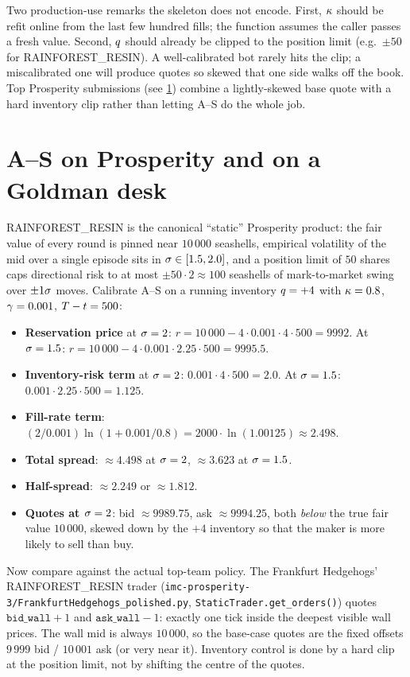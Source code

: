 Two production-use remarks the skeleton does not encode. First,
$\kappa$ should be refit online from the last few hundred
fills; the function assumes the caller passes a fresh value. Second,
$q$ should already be clipped to the position limit (e.g.\
$\pm 50$ for RAINFOREST\_RESIN). A well-calibrated bot rarely hits
the clip; a miscalibrated one will produce quotes so skewed that
one side walks off the book. Top Prosperity submissions (see
\cref{sec:ch8_onprosperity}) combine a lightly-skewed base quote
with a hard inventory clip rather than letting A--S do the whole
job.

\section{A--S on Prosperity and on a Goldman desk}
\label{sec:ch8_onprosperity}

\begin{prosperitybox}[title={Prosperity example: RAINFOREST\_RESIN}]
RAINFOREST\_RESIN is the canonical ``static'' Prosperity
product: the fair value of every round is pinned near
$10\,000$ seashells, empirical volatility of the mid over a
single episode sits in $\sigma \in [1.5, 2.0]$, and a position
limit of $50$ shares caps directional risk to at most
$\pm 50 \cdot 2 \approx 100$ seashells of mark-to-market swing
over $\pm 1\sigma$ moves. Calibrate A--S on a running inventory
$q = +4$ with $\kappa = 0.8$, $\gamma = 0.001$,
$T - t = 500$:
\begin{itemize}
  \item \textbf{Reservation price} at $\sigma = 2$:
  $r = 10\,000 - 4 \cdot 0.001 \cdot 4 \cdot 500 = 9992$.
  At $\sigma = 1.5$: $r = 10\,000 - 4 \cdot 0.001 \cdot 2.25
  \cdot 500 = 9995.5$.
  \item \textbf{Inventory-risk term} at $\sigma = 2$:
  $0.001 \cdot 4 \cdot 500 = 2.0$. At $\sigma = 1.5$:
  $0.001 \cdot 2.25 \cdot 500 = 1.125$.
  \item \textbf{Fill-rate term}: $(2/0.001)\ln(1 + 0.001/0.8)
  = 2000 \cdot \ln(1.00125) \approx 2.498$.
  \item \textbf{Total spread}: $\approx 4.498$ at $\sigma = 2$,
  $\approx 3.623$ at $\sigma = 1.5$.
  \item \textbf{Half-spread}: $\approx 2.249$ or $\approx 1.812$.
  \item \textbf{Quotes at $\sigma = 2$}: bid
  $\approx 9989.75$, ask $\approx 9994.25$, both
  \emph{below} the true fair value $10\,000$, skewed down by
  the $+4$ inventory so that the maker is more likely to sell
  than buy.
\end{itemize}
Now compare against the actual top-team policy. The Frankfurt
Hedgehogs' RAINFOREST\_RESIN trader
(\texttt{imc-prosperity-3/FrankfurtHedgehogs\_polished.py},
\texttt{StaticTrader.get\_orders()}) quotes $\texttt{bid\_wall}
+ 1$ and $\texttt{ask\_wall} - 1$: exactly one tick inside
the deepest visible wall prices. The wall mid is always
$10\,000$, so the base-case quotes are the fixed offsets
$9\,999$ bid / $10\,001$ ask (or very near it). Inventory
control is done by a hard clip at the position limit, not by
shifting the centre of the quotes.
\end{prosperitybox}

